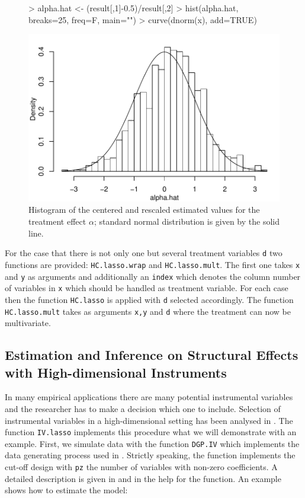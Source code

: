 \documentclass{amsart}
\begin{document}
\begin{figure}[h!]
\begin{center}
\label{HC}
\begin{Schunk}
\begin{Sinput}
> alpha.hat <- (result[,1]-0.5)/result[,2]
> hist(alpha.hat, breaks=25, freq=F, main="")
> curve(dnorm(x), add=TRUE)
\end{Sinput}
\end{Schunk}
\includegraphics{HDM-HC}
\end{center}
\caption{Histogram of the centered and rescaled estimated values for the treatment effect $\alpha$; standard normal distribution is given by the solid line.}
\end{figure}

For the case that there is not only one but several treatment variables \texttt{d} two functions are provided: \texttt{HC.lasso.wrap} and \texttt{HC.lasso.mult}. The first one takes \texttt{x} and \texttt{y} as arguments and additionally an \texttt{index} which denotes the column number of variables in \texttt{x} which should be handled as treatment variable. For each case then the function \texttt{HC.lasso} is applied with \texttt{d} selected accordingly. The function \texttt{HC.lasso.mult} takes as arguments \texttt{x,y} and \texttt{d} where the treatment can now be multivariate.


\subsection{Estimation and Inference on Structural Effects with High-dimensional Instruments}
In many empirical applications there are many potential instrumental variables and the researcher has to make a decision which one to include. Selection of instrumental variables in a high-dimensional setting has been analysed in \cite{BCCH12}. The function \texttt{IV.lasso} implements this procedure what we will demonstrate with an example.
First, we simulate data with the function \texttt{DGP.IV} which implements the data generating process used in \cite{BCCH12}. Strictly speaking, the function implements the cut-off design with \texttt{pz} the number of variables with non-zero coefficients. A detailed description is given in \cite{BCCH12} and in the help for the function. An example shows how to estimate the model:
\end{document}
